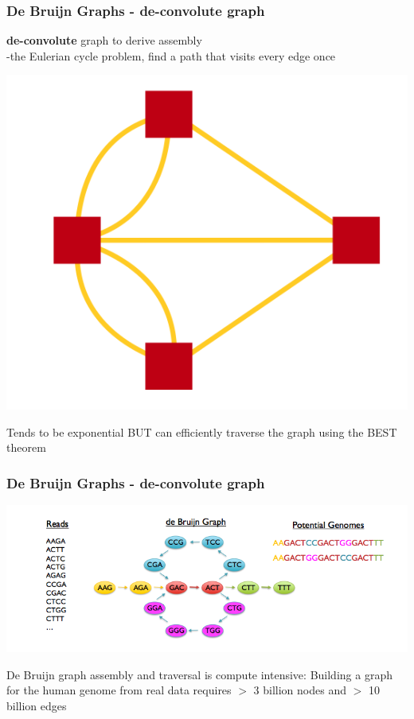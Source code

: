 \documentclass[pdf]{beamer}
\begin{document}
\begin{frame}
\frametitle{De Bruijn Graphs - de-convolute graph}
\textbf{de-convolute} graph to derive assembly\\ -the Eulerian cycle problem, find a path that visits every edge once\\
\begin{center}
\includegraphics[scale=0.2]{Figures/eurler.png} 
\end{center}
Tends to be exponential BUT can efficiently traverse the graph using the BEST theorem
\end{frame}

\begin{frame}
\frametitle{De Bruijn Graphs - de-convolute graph}
\begin{center}
\includegraphics[scale=.45]{Figures/eulerreduce.png} 
\end{center}
De Bruijn graph assembly and traversal is compute intensive: Building a graph for the human genome from real data requires $>$ 3 billion nodes and $>$ 10 billion edges
\end{frame}
\end{document}
